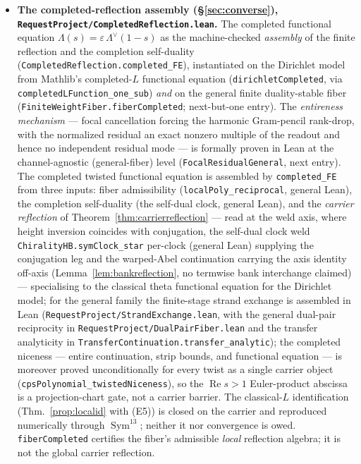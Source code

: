 \documentclass[11pt]{article}
\theoremstyle{definition}
\renewcommand{\Re}{\operatorname{Re}}
\newcommand{\Sym}{\operatorname{Sym}}
\begin{document}
\begin{itemize}
\item \textbf{The completed-reflection assembly (\S\ref{sec:converse}),
\texttt{RequestProject/CompletedReflection.lean}.} The completed functional equation
$\Lambda(s)=\varepsilon\,\Lambda^\vee(1-s)$ as the machine-checked \emph{assembly} of the finite reflection
and the completion self-duality (\texttt{CompletedReflection.completed\_FE}), instantiated on
the Dirichlet model from Mathlib's completed-$L$ functional equation (\texttt{dirichletCompleted}, via
\texttt{completedLFunction\_one\_sub}) \emph{and} on the general finite duality-stable fiber
(\texttt{FiniteWeightFiber.fiberCompleted}; next-but-one entry).  The
\emph{entireness mechanism} --- focal cancellation forcing the harmonic Gram-pencil rank-drop, with the
normalized residual an exact nonzero multiple of the readout and hence no independent residual mode --- is
formally proven in Lean at the channel-agnostic (general-fiber) level (\texttt{FocalResidualGeneral}, next
entry). The completed twisted functional equation is assembled by \texttt{completed\_FE} from three inputs:
fiber admissibility (\texttt{localPoly\_reciprocal}, general Lean), the completion self-duality (the self-dual
clock, general Lean), and the \emph{carrier reflection} of Theorem~\ref{thm:carrierreflection} --- read at the
weld axis, where height inversion coincides with conjugation, the self-dual clock weld
\texttt{ChiralityHB.symClock\_star} per-clock (general Lean) supplying the conjugation leg and the warped-Abel
continuation carrying the axis identity off-axis (Lemma~\ref{lem:bankreflection}, no termwise bank interchange
claimed) --- specialising to the classical theta functional equation for
the Dirichlet model; for the general family the finite-stage strand exchange is assembled in Lean
(\texttt{RequestProject/StrandExchange.lean}, with the general dual-pair reciprocity in
\texttt{RequestProject/DualPairFiber.lean} and the transfer analyticity in
\texttt{TransferContinuation.transfer\_analytic}); the completed niceness --- entire continuation,
strip bounds, and functional equation --- is moreover proved unconditionally for every twist as a
single carrier object (\texttt{cpsPolynomial\_twistedNiceness}), so the $\Re s>1$ Euler-product
abscissa is a projection-chart gate, not a carrier barrier.  The classical-$L$ identification
(Thm.~\ref{prop:localid} with \textup{(E5)}) is closed on the carrier and reproduced numerically
through $\Sym^{13}$; neither it nor convergence is owed. \texttt{fiberCompleted}
certifies the fiber's admissible \emph{local} reflection algebra; it is not the global carrier reflection.


\end{itemize}
\end{document}
